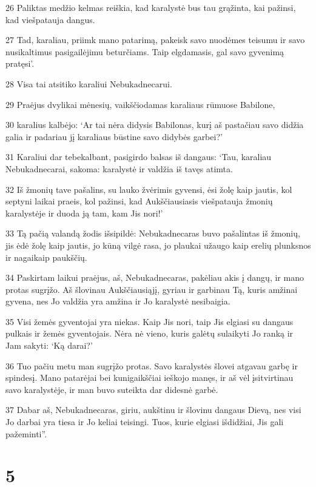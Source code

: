 \par 26 Paliktas medžio kelmas reiškia, kad karalystė bus tau grąžinta, kai pažinsi, kad viešpatauja dangus. 
\par 27 Tad, karaliau, priimk mano patarimą, pakeisk savo nuodėmes teisumu ir savo nusikaltimus pasigailėjimu beturčiams. Taip elgdamasis, gal savo gyvenimą pratęsi’. 
\par 28 Visa tai atsitiko karaliui Nebukadnecarui. 
\par 29 Praėjus dvylikai mėnesių, vaikščiodamas karaliaus rūmuose Babilone, 
\par 30 karalius kalbėjo: ‘Ar tai nėra didysis Babilonas, kurį aš pastačiau savo didžia galia ir padariau jį karaliaus būstine savo didybės garbei?’ 
\par 31 Karaliui dar tebekalbant, pasigirdo balsas iš dangaus: ‘Tau, karaliau Nebukadnecarai, sakoma: karalystė ir valdžia iš tavęs atimta. 
\par 32 Iš žmonių tave pašalins, su lauko žvėrimis gyvensi, ėsi žolę kaip jautis, kol septyni laikai praeis, kol pažinsi, kad Aukščiausiasis viešpatauja žmonių karalystėje ir duoda ją tam, kam Jis nori!’ 
\par 33 Tą pačią valandą žodis išsipildė: Nebukadnecaras buvo pašalintas iš žmonių, jis ėdė žolę kaip jautis, jo kūną vilgė rasa, jo plaukai užaugo kaip erelių plunksnos ir nagai­kaip paukščių. 
\par 34 Paskirtam laikui praėjus, aš, Nebukadnecaras, pakėliau akis į dangų, ir mano protas sugrįžo. Aš šlovinau Aukščiausiąjį, gyriau ir garbinau Tą, kuris amžinai gyvena, nes Jo valdžia yra amžina ir Jo karalystė nesibaigia. 
\par 35 Visi žemės gyventojai yra niekas. Kaip Jis nori, taip Jis elgiasi su dangaus pulkais ir žemės gyventojais. Nėra nė vieno, kuris galėtų sulaikyti Jo ranką ir Jam sakyti: ‘Ką darai?’ 
\par 36 Tuo pačiu metu man sugrįžo protas. Savo karalystės šlovei atgavau garbę ir spindesį. Mano patarėjai bei kunigaikščiai ieškojo manęs, ir aš vėl įsitvirtinau savo karalystėje, ir man buvo suteikta dar didesnė garbė. 
\par 37 Dabar aš, Nebukadnecaras, giriu, aukštinu ir šlovinu dangaus Dievą, nes visi Jo darbai yra tiesa ir Jo keliai teisingi. Tuos, kurie elgiasi išdidžiai, Jis gali pažeminti”.



\chapter{5}


